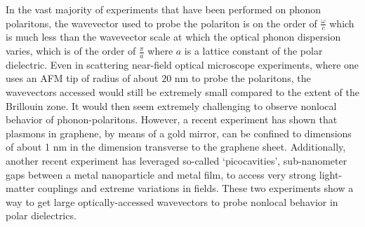 \documentclass[aps,prb,twocolumn,
	groupedaddress,superscriptaddress,
	amsfonts,amssymb,amsmath,floatfix,
	citeautoscript]{revtex4-1}
\begin{document}
In the vast majority of experiments that have been performed on phonon polaritons, the wavevector used to probe the polariton is on the order of $\frac{\omega}{c}$ which is much less than the wavevector scale at which the optical phonon dispersion varies, which is of the order of $\frac{\pi}{a}$ where $a$ is a lattice constant of the polar dielectric.  Even in scattering near-field optical microscope experiments, where one uses an AFM tip of radius of about $20$ nm to probe the polaritons, the wavevectors accessed would still be extremely small compared to the extent of the Brillouin zone. It would then seem extremely challenging to observe nonlocal behavior of phonon-polaritons. However, a recent experiment \cite{iranzo2018probing} has shown that plasmons in graphene, by means of a gold mirror, can be confined to dimensions of about 1 nm in the dimension transverse to the graphene sheet. Additionally, another recent experiment \cite{benz2016single} has leveraged so-called `picocavities', sub-nanometer gaps between a metal nanoparticle and metal film, to access very strong light-matter couplings and extreme variations in fields. These two experiments show a way to get large optically-accessed wavevectors to probe nonlocal behavior in polar dielectrics.



 
\end{document}
